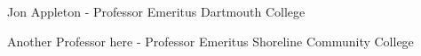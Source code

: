 

\begin{cvhonors}

  \cvhonor
    {Jon Appleton - Professor Emeritus} %
    {Dartmouth College} %
    {} %
    {} %

  \cvhonor
    {Another Professor here - Professor Emeritus} %
    {Shoreline Community College} %
    {} %
    {} %
    
\end{cvhonors}
